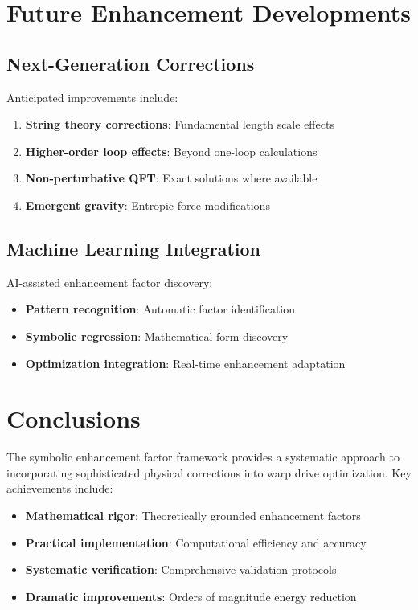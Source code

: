 \documentclass[12pt,a4paper]{article}
\begin{document}
\section{Future Enhancement Developments}

\subsection{Next-Generation Corrections}

Anticipated improvements include:

\begin{enumerate}
\item \textbf{String theory corrections}: Fundamental length scale effects
\item \textbf{Higher-order loop effects}: Beyond one-loop calculations
\item \textbf{Non-perturbative QFT}: Exact solutions where available
\item \textbf{Emergent gravity}: Entropic force modifications
\end{enumerate}

\subsection{Machine Learning Integration}

AI-assisted enhancement factor discovery:

\begin{itemize}
\item \textbf{Pattern recognition}: Automatic factor identification
\item \textbf{Symbolic regression}: Mathematical form discovery
\item \textbf{Optimization integration}: Real-time enhancement adaptation
\end{itemize}

\section{Conclusions}

The symbolic enhancement factor framework provides a systematic approach to incorporating sophisticated physical corrections into warp drive optimization. Key achievements include:

\begin{itemize}
\item \textbf{Mathematical rigor}: Theoretically grounded enhancement factors
\item \textbf{Practical implementation}: Computational efficiency and accuracy
\item \textbf{Systematic verification}: Comprehensive validation protocols
\item \textbf{Dramatic improvements}: Orders of magnitude energy reduction
\end{itemize}
\end{document}
